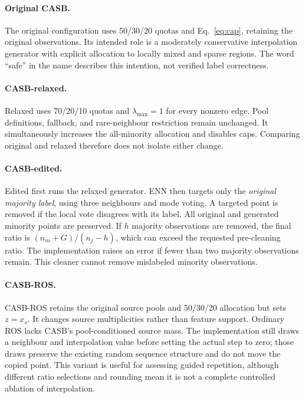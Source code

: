 \documentclass[conference]{IEEEtran}
\begin{document}
\paragraph{Original CASB.} The original configuration uses 50/30/20 quotas and Eq.~\eqref{eq:cap}, retaining the original observations. Its intended role is a moderately conservative interpolation generator with explicit allocation to locally mixed and sparse regions. The word ``safe'' in the name describes this intention, not verified label correctness.

\paragraph{CASB-relaxed.} Relaxed uses 70/20/10 quotas and $\lambda_{\max}=1$ for every nonzero edge. Pool definitions, fallback, and rare-neighbour restriction remain unchanged. It simultaneously increases the all-minority allocation and disables caps. Comparing original and relaxed therefore does not isolate either change.

\paragraph{CASB-edited.} Edited first runs the relaxed generator. ENN then targets only the \emph{original majority label}, using three neighbours and mode voting. A targeted point is removed if the local vote disagrees with its label. All original and generated minority points are preserved. If $h$ majority observations are removed, the final ratio is $(n_m+G)/(n_j-h)$, which can exceed the requested pre-cleaning ratio. The implementation raises an error if fewer than two majority observations remain. This cleaner cannot remove mislabeled minority observations.

\paragraph{CASB-ROS.} CASB-ROS retains the original source pools and 50/30/20 allocation but sets $z=x_s$. It changes source multiplicities rather than feature support. Ordinary ROS lacks CASB's pool-conditioned source mass. The implementation still draws a neighbour and interpolation value before setting the actual step to zero; those draws preserve the existing random sequence structure and do not move the copied point. This variant is useful for assessing guided repetition, although different ratio selections and rounding mean it is not a complete controlled ablation of interpolation.
\end{document}
